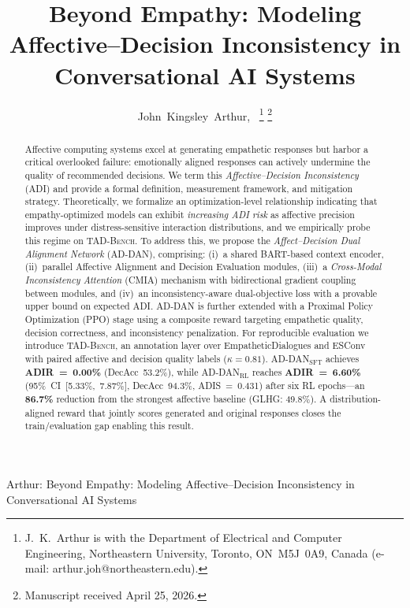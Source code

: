 \documentclass[lettersize,journal]{IEEEtran}
\begin{document}
\title{Beyond Empathy: Modeling Affective--Decision Inconsistency in Conversational AI Systems}

\author{John~Kingsley~Arthur,~%
\thanks{J.~K.~Arthur is with the Department of Electrical and Computer
Engineering, Northeastern University, Toronto, ON~M5J~0A9, Canada
(e-mail: arthur.joh@northeastern.edu).}%
\thanks{Manuscript received April 25, 2026.}}

%
{Arthur: Beyond Empathy: Modeling Affective--Decision Inconsistency in Conversational AI Systems}


\maketitle

\begin{abstract}
Affective computing systems excel at generating empathetic responses but
harbor a critical overlooked failure: emotionally aligned responses can
actively undermine the quality of recommended decisions.
We term this \emph{Affective--Decision Inconsistency} (ADI) and provide
a formal definition, measurement framework, and mitigation strategy.
Theoretically, we formalize an optimization-level relationship indicating
that empathy-optimized models can exhibit \emph{increasing ADI risk}
as affective precision improves under distress-sensitive interaction
distributions, and we empirically probe this regime on \textsc{TAD-Bench}.
To address this, we propose the \emph{Affect--Decision Dual Alignment
Network} (AD-DAN), comprising: (i)~a shared BART-based context encoder,
(ii)~parallel Affective Alignment and Decision Evaluation modules,
(iii)~a \emph{Cross-Modal Inconsistency Attention} (CMIA) mechanism with
bidirectional gradient coupling between modules, and (iv)~an
inconsistency-aware dual-objective loss with a provable upper bound on
expected ADI.  AD-DAN is further extended with a Proximal Policy
Optimization (PPO) stage using a composite reward targeting empathetic
quality, decision correctness, and inconsistency penalization.
For reproducible evaluation we introduce \textsc{TAD-Bench}, an annotation
layer over EmpatheticDialogues and ESConv with paired affective and decision
quality labels ($\kappa{=}0.81$).
AD-DAN$_\mathrm{SFT}$ achieves \textbf{ADIR~=~0.00\%} (DecAcc~53.2\%),
while AD-DAN$_\mathrm{RL}$ reaches \textbf{ADIR~=~6.60\%}
(95\%~CI~[5.33\%,~7.87\%], DecAcc~94.3\%, ADIS~=~0.431) after six RL
epochs---an \textbf{86.7\%} reduction from the strongest affective baseline
(GLHG: 49.8\%).  A distribution-aligned reward that jointly scores generated
and original responses closes the train/evaluation gap enabling this result.
\end{abstract}
\end{document}
